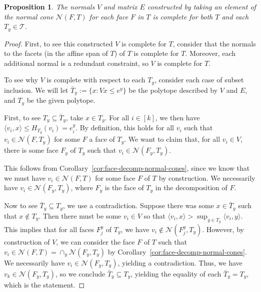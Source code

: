 \documentclass[12pt]{article}
\newcommand{\N}{\mathcal{N}}
\newcommand{\T}{\mathcal{T}}
\newcommand{\inprod}[2]{\langle #1, #2 \rangle}%
\newtheorem{proposition}{Proposition}
\begin{document}
  \begin{proposition}
  	The normals $V$ and matrix $E$ constructed by taking an element of the normal cone $\N(F, T)$ for each face $F$ in $T$ is complete for both $T$ and each $T_y \in \T$.
  \end{proposition}
  \begin{proof}
  	First, to see this constructed $V$ is complete for $T$, consider that the normals to the facets (in the affine span of $T$) of $T$ is complete for $T$.
  	Moreover, each additional normal is a redundant constraint, so
  	$V$ is complete for $T$.
  	
  	To see why $V$ is complete with respect to each $T_y$, consider each case of subset inclusion.
  	We will let $\bar T_y := \{ x : Vx \leq e^y\}$ be the polytope described by $V$ and $E$, and $T_y$ be the given polytope.
  	
  	First,  to see $T_y \subseteq \bar T_y$, take $x \in T_y$.
  	For all $i \in [k]$, we then have $\inprod{v_i}{x} \leq H_{T_y}(v_i) = e^y_i$.
  	By definition, this holds for all $v_i$ such that $v_i \in \N(F, T_y)$ for some $F$ a face of $T_y$.
  	We want to claim that, for all $v_i \in V$, there is some face $F_y$ of $T_y$ such that $v_i \in \N(F_y, T_y)$.
  	
  	This follows from Corollary~\ref{cor:face-decomp-normal-cones}, since we know that we must have $v_i \in \N(F, T)$ for some face $F$ of $T$ by construction.
  	We necessarily have $v_i \in \N(F_y, T_y)$, where $F_y$ is the face of $T_y$ in the decomposition of $F$.
  	
  	Now to see $\bar T_y \subseteq T_y$, we use a contradiction.
  	Suppose there was some $x \in \bar T_y$ such that $x \not \in T_y$.
  	Then there must be some $v_i \in V$ so that $\inprod {v_i}{x} > \sup_{y \in T_y} \inprod{v_i}{y}$.
  	This implies that for all faces $F_{j}^y$ of $T_y$, we have $v_i \not \in \N(F_{j}^y, T_y)$.
  	However, by construction of $V$, we can consider the face $F$ of $T$ such that $v_i \in \N(F,T) = \cap_y \N(F_y, T_y)$ by Corollary~\ref{cor:face-decomp-normal-cones}.
  	We necessarily have $v_i \in \N(F_y, T_y)$, yielding a contradiction.
  	Thus, we have $v_k \in \N(F_y, T_y)$, so we conclude $\bar T_y \subseteq T_y$, yielding the equality of each $\bar T_y = T_y$, which is the statement.
  \end{proof}
  
\end{document}
